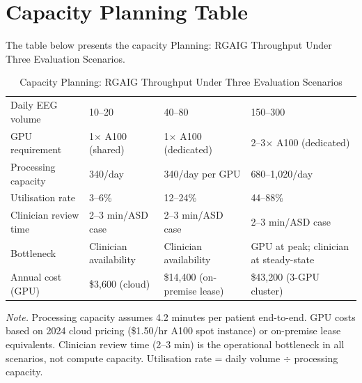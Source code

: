 \section*{Capacity Planning Table}
\label{sec:app_ch5_tab_capacity_planning}
\noindent The table below presents the capacity Planning: RGAIG Throughput Under Three Evaluation Scenarios.

\begin{table}[H]
\tablestripes
\tablefontsize
\caption[Capacity Planning Scenarios]{Capacity Planning: RGAIG Throughput Under Three Evaluation Scenarios}
\begin{tabularx}{\textwidth}{@{} p{2.0cm} L L L @{}}
\toprule
{} &  &  &  \\
\midrule
Daily EEG volume & 10--20 & 40--80 & 150--300 \\
GPU requirement & 1$\times$ A100 (shared) & 1$\times$ A100 (dedicated) & 2--3$\times$ A100 (dedicated) \\
Processing capacity & 340/day & 340/day per GPU & 680--1,020/day \\
Utilisation rate & 3--6\% & 12--24\% & 44--88\% \\
Clinician review time & 2--3 min/ASD case & 2--3 min/ASD case & 2--3 min/ASD case \\
Bottleneck & Clinician availability & Clinician availability & GPU at peak; clinician at steady-state \\
Annual cost (GPU) & \$3,600 (cloud) & \$14,400 (on-premise lease) & \$43,200 (3-GPU cluster) \\
\bottomrule
\end{tabularx}
\vspace{0.5em}\noindent\textit{Note.} Processing capacity assumes 4.2 minutes per patient end-to-end. GPU costs based on 2024 cloud pricing (\$1.50/hr A100 spot instance) or on-premise lease equivalents. Clinician review time (2--3 min) is the operational bottleneck in all scenarios, not compute capacity. Utilisation rate = daily volume $\div$ processing capacity.
\end{table}



